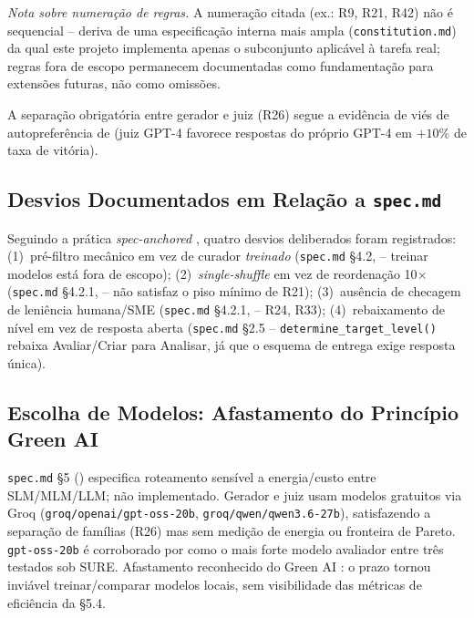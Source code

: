 \documentclass[12pt]{article}
\begin{document}
\emph{Nota sobre numeração de regras.} A numeração citada (ex.: R9,
R21, R42) não é sequencial -- deriva de uma especificação interna mais
ampla (\texttt{constitution.md}) da qual este projeto implementa apenas
o subconjunto aplicável à tarefa real; regras fora de escopo permanecem
documentadas como fundamentação para extensões futuras, não como
omissões.

A separação obrigatória entre gerador e juiz (R26) segue a evidência de
viés de autopreferência de \cite{zheng2023judging} (juiz GPT-4 favorece
respostas do próprio GPT-4 em $+10\%$ de taxa de vitória).

\subsection{Desvios Documentados em Relação a \texttt{spec.md}}
\label{sec:desvios}

Seguindo a prática \emph{spec-anchored} \cite{piskala2026specdriven},
quatro desvios deliberados foram registrados: (1)~pré-filtro mecânico em
vez de curador \emph{treinado} (\texttt{spec.md} \S4.2,
\cite{seedat2025datacentric} -- treinar modelos está fora de escopo);
(2)~\emph{single-shuffle} em vez de reordenação 10$\times$
(\texttt{spec.md} \S4.2.1, \cite{pezeshkpour2024large} -- não satisfaz
o piso mínimo de R21); (3)~ausência de checagem de leniência humana/SME
(\texttt{spec.md} \S4.2.1, \cite{kim2025stairaig} -- R24, R33);
(4)~rebaixamento de nível em vez de resposta aberta
(\texttt{spec.md} \S2.5 -- \texttt{determine\_target\_level()} rebaixa
Avaliar/Criar para Analisar, já que o esquema de entrega exige resposta
única).

\subsection{Escolha de Modelos: Afastamento do Princípio Green AI}
\label{sec:green-ai}

\texttt{spec.md} \S5 (\cite{bai2024beyond}) especifica roteamento
sensível a energia/custo entre SLM/MLM/LLM; não implementado. Gerador e
juiz usam modelos gratuitos via Groq
(\texttt{groq/openai/gpt-oss-20b}, \texttt{groq/qwen/qwen3.6-27b}),
satisfazendo a separação de famílias (R26) mas sem medição de energia
ou fronteira de Pareto. \texttt{gpt-oss-20b} é corroborado por
\cite{korthals2026sure} como o mais forte modelo avaliador entre três
testados sob SURE. Afastamento reconhecido do Green AI
\cite{verdecchia2023systematic,shao2026routeandreason}: o prazo tornou
inviável treinar/comparar modelos locais, sem visibilidade das
métricas de eficiência da \S5.4.
\end{document}
